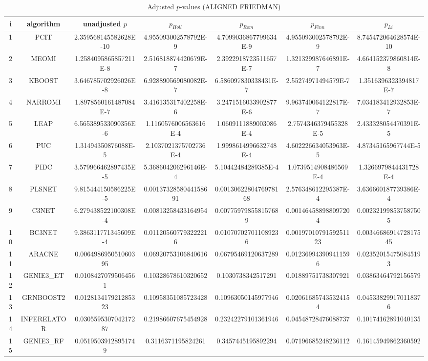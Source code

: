 \documentclass[a4paper,10pt]{article}
\begin{document}
\begin{landscape}
\begin{table}[!htp]
\centering\scriptsize
\caption{Adjusted $p$-values (ALIGNED FRIEDMAN)}
\begin{tabular}{ccccccc}
i&algorithm&unadjusted $p$&$p_{Holl}$&$p_{Rom}$&$p_{Finn}$&$p_{Li}$\\
\hline
1&PCIT&2.359568145582628E-10&4.955093002578792E-9&4.7099036867799634E-9&4.955093002578792E-9&8.745472064628574E-10\\
2&MEOMI&1.2584095865857211E-8&2.516818874420679E-7&2.3922918723511657E-7&1.321329987646891E-7&4.664152379860814E-8\\
3&KBOOST&3.646785702926026E-8&6.928890569080082E-7&6.586097830338431E-7&2.55274971494579E-7&1.3516396323394817E-7\\
4&NARROMI&1.8978560161487084E-7&3.416135317402258E-6&3.2471516033902877E-6&9.963740064122817E-7&7.034183412932853E-7\\
5&LEAP&6.565389533090356E-6&1.1160576006563616E-4&1.0609111889003086E-4&2.7574346379455328E-5&2.433328054470391E-5\\
6&PUC&1.31494350876088E-5&2.1037021375702736E-4&1.9998614996632748E-4&4.602226634053963E-5&4.87345165967744E-5\\
7&PIDC&3.579966462897435E-5&5.368604206296146E-4&5.10442484289385E-4&1.0739514908486569E-4&1.3266979844431728E-4\\
8&PLSNET&9.815444150586225E-5&0.0013732858044158691&0.0013062280476978168&2.576348612295387E-4&3.636660187739386E-4\\
9&C3NET&6.279438522100308E-4&0.00813258433164954&0.007759798558157689&0.001464588988097204&0.002321998537587505\\
10&BC3NET&9.386311771345609E-4&0.011205607793222216&0.010707027011089236&0.0019701079159251123&0.0034668691472817545\\
11&ARACNE&0.006498695051060395&0.06920753106840616&0.06795469120637289&0.012369943909411596&0.023520154750845193\\
12&GENIE3_ET&0.01084270795064561&0.10328678610320652&0.1030738342517291&0.01889751738307921&0.03863464792156579\\
13&GRNBOOST2&0.012813417921285323&0.10958351085723428&0.10963050145977946&0.020616857435324154&0.045338299170118376\\
14&INFERELATOR&0.030559530704217287&0.21986607675454928&0.23242279101361946&0.04548728476088737&0.10174162891040135\\
15&GENIE3_RF&0.05195039128951749&0.3116371195824261&0.3457445195892294&0.07196685248236112&0.16145949862360592\\

\end{tabular}
\end{table}
\end{landscape}
\end{document}
